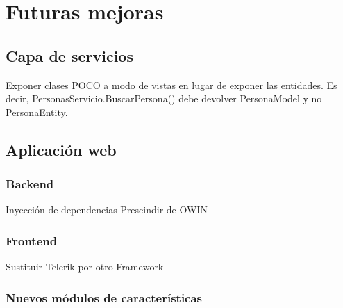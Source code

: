 \chapter{Futuras mejoras}

\section{Capa de servicios}
Exponer clases POCO a modo de vistas en lugar de exponer las entidades. Es decir, PersonasServicio.BuscarPersona() debe devolver PersonaModel y no PersonaEntity.

\section{Aplicación web}

\subsection{Backend}
Inyección de dependencias
Prescindir de OWIN

\subsection{Frontend}
Sustituir Telerik por otro Framework

\subsection{Nuevos módulos de características}